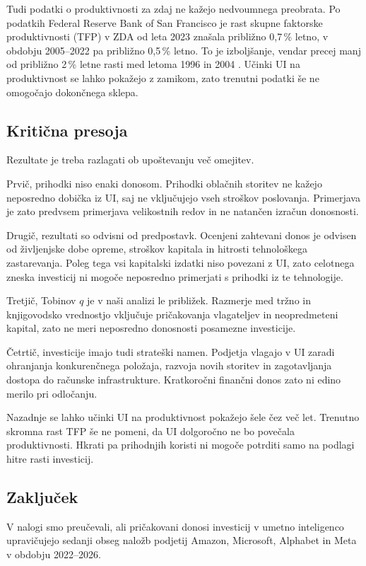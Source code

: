 \documentclass[12pt,a4paper]{article}
\begin{document}
Tudi podatki o produktivnosti za zdaj ne kažejo nedvoumnega preobrata. Po podatkih Federal Reserve Bank of San Francisco je rast skupne faktorske produktivnosti (TFP) v ZDA od leta 2023 znašala približno 0,7\,\% letno, v obdobju 2005--2022 pa približno 0,5\,\% letno. To je izboljšanje, vendar precej manj od približno 2\,\% letne rasti med letoma 1996 in 2004 \citep{SFFedViews2026}. Učinki UI na produktivnost se lahko pokažejo z zamikom, zato trenutni podatki še ne omogočajo dokončnega sklepa.

\subsection{Kritična presoja}

Rezultate je treba razlagati ob upoštevanju več omejitev.

Prvič, prihodki niso enaki donosom. Prihodki oblačnih storitev ne kažejo neposredno dobička iz UI, saj ne vključujejo vseh stroškov poslovanja. Primerjava je zato predvsem primerjava velikostnih redov in ne natančen izračun donosnosti.

Drugič, rezultati so odvisni od predpostavk. Ocenjeni zahtevani donos je odvisen od življenjske dobe opreme, stroškov kapitala in hitrosti tehnološkega zastarevanja. Poleg tega vsi kapitalski izdatki niso povezani z UI, zato celotnega zneska investicij ni mogoče neposredno primerjati s prihodki iz te tehnologije.

Tretjič, Tobinov $q$ je v naši analizi le približek. Razmerje med tržno in knjigovodsko vrednostjo vključuje pričakovanja vlagateljev in neopredmeteni kapital, zato ne meri neposredno donosnosti posamezne investicije.

Četrtič, investicije imajo tudi strateški namen. Podjetja vlagajo v UI zaradi ohranjanja konkurenčnega položaja, razvoja novih storitev in zagotavljanja dostopa do računske infrastrukture. Kratkoročni finančni donos zato ni edino merilo pri odločanju.

Nazadnje se lahko učinki UI na produktivnost pokažejo šele čez več let. Trenutno skromna rast TFP še ne pomeni, da UI dolgoročno ne bo povečala produktivnosti. Hkrati pa prihodnjih koristi ni mogoče potrditi samo na podlagi hitre rasti investicij.

\subsection{Zaključek}

V nalogi smo preučevali, ali pričakovani donosi investicij v umetno inteligenco upravičujejo sedanji obseg naložb podjetij Amazon, Microsoft, Alphabet in Meta v obdobju 2022--2026.
\end{document}
